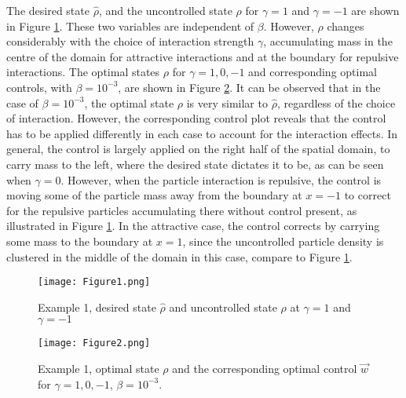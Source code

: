  The desired state $\widehat \rho$, and the uncontrolled state $\rho$ for $\gamma =1$ and $\gamma = -1$ are shown in Figure \ref{Ex12DN1}. These two variables are independent of $\beta$. However, $\rho$ changes considerably with the choice of interaction strength $\gamma$, accumulating mass in the centre of the domain for attractive interactions and at the boundary for repulsive interactions. The optimal states $\rho$ for $\gamma = 1,0,-1$ and corresponding optimal controls, with $\beta = 10^{-3}$, are shown in Figure \ref{Ex12DN2}. 
It can be observed that in the case of $\beta = 10^{-3}$, the optimal state $\rho$ is very similar to $\hat \rho$, regardless of the choice of interaction. However, the corresponding control plot reveals that the control has to be applied differently in each case to account for the interaction effects. In general, the control is largely applied on the right half of the spatial domain, to carry mass to the left, where the desired state dictates it to be, as can be seen when $\gamma = 0$. However, when the particle interaction is repulsive, the control is moving some of the particle mass away from the boundary at $x=-1$ to correct for the repulsive particles accumulating there without control present, as illustrated in Figure \ref{Ex12DN1}. In the attractive case, the control corrects by carrying some mass to the boundary at $x=1$, since the uncontrolled particle density is clustered in the middle of the domain in this case, compare to Figure \ref{Ex12DN1}.
\begin{figure}[h]
	\texttt{[image: Figure1.png]}
	\caption{Example 1, desired state $\widehat \rho$ and uncontrolled state $\rho$ at $\gamma =1$ and $\gamma =-1$}
	\label{Ex12DN1}
\end{figure}
\begin{figure}[h]
	\texttt{[image: Figure2.png]}
	\caption{Example 1, optimal state $\rho$ and the corresponding optimal control $\vec{w}$ for $\gamma = 1,0,-1$, $\beta = 10^{-3}$.}
	\label{Ex12DN2}
\end{figure}



